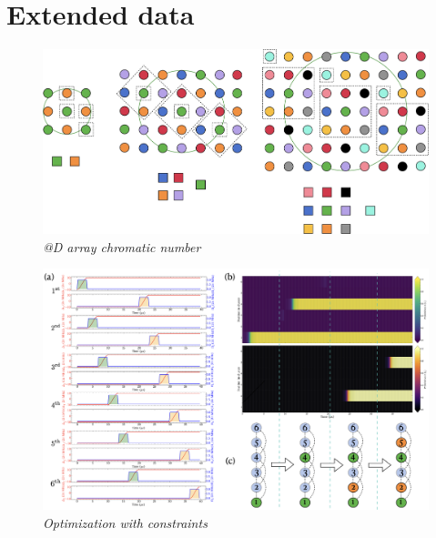 \documentclass[%
 reprint,
nofootinbib,
 amsmath,amssymb,
 aps,
pra,
floatfix,
]{revtex4-2}
\begin{document}
\section{Extended data}

\begin{figure}[ht!]
    \centering
    \includegraphics[width=15cm]{picture/2D_array_coloring.png}
    \caption{\textit{@D array chromatic number}}
    \label{fig:case2_opt}
\end{figure}


\begin{figure}[ht!]
    \centering
    \includegraphics[width=14cm]{picture/GCP_6atom.png}
    \caption{\textit{Optimization with constraints}}
    \label{fig:case3_opt}
\end{figure}
\end{document}
